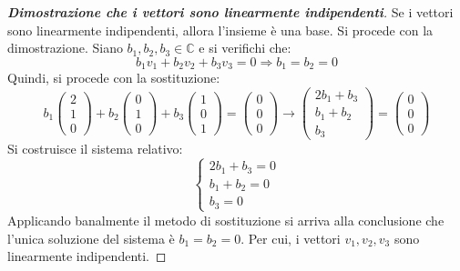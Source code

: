 \documentclass[a4paper]{article}
\begin{document}
	\begin{proof}[\textbf{Dimostrazione che i vettori sono linearmente indipendenti}]
		Se i vettori sono linearmente indipendenti, allora l'insieme è una base. Si procede con la dimostrazione. Siano $b_{1}, b_{2}, b_{3} \in \mathbb{C}$ e si verifichi che:
		\begin{equation*}
			b_{1}v_{1} + b_{2}v_{2} + b_{3}v_{3} = 0 \Rightarrow b_{1} = b_{2} = 0
		\end{equation*}
		Quindi, si procede con la sostituzione:
		\begin{equation*}
			b_{1} \begin{pmatrix}
				2 \\ 1 \\ 0
			\end{pmatrix} + b_{2} \begin{pmatrix}
				0 \\ 1 \\ 0
			\end{pmatrix} + b_{3} \begin{pmatrix}
				1 \\ 0 \\ 1
			\end{pmatrix} = \begin{pmatrix}
				0 \\ 0 \\ 0
			\end{pmatrix} \longrightarrow
			\begin{pmatrix}
				2b_{1} + b_{3} \\
				b_{1}  + b_{2} \\
				b_{3}
			\end{pmatrix} = \begin{pmatrix}
				0 \\ 0 \\ 0
			\end{pmatrix}
		\end{equation*}
		Si costruisce il sistema relativo:
		\begin{equation*}
			\begin{cases}
				2b_{1} + b_{3} = 0 \\
				b_{1}  + b_{2} = 0 \\
				b_{3} = 0
			\end{cases}
		\end{equation*}
		Applicando banalmente il metodo di sostituzione si arriva alla conclusione che l'unica soluzione del sistema è $b_{1} = b_{2} = 0$. Per cui, i vettori $v_{1}, v_{2}, v_{3}$ sono linearmente indipendenti.
	\end{proof} \:\newline
	
\end{document}
